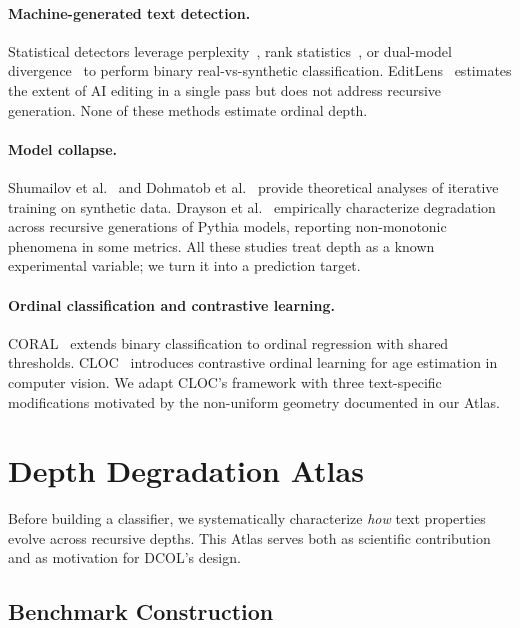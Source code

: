 \documentclass[11pt,a4paper]{article}
\newcommand{\ours}{DCOL}
\newcommand{\atlas}{Atlas}
\begin{document}
\paragraph{Machine-generated text detection.}
Statistical detectors leverage perplexity~\cite{solaiman2019release}, rank statistics~\cite{mitchell2023detectgpt}, or dual-model divergence~\cite{hans2024binoculars,diveye2024} to perform binary real-vs-synthetic classification.
EditLens~\cite{editlens2024} estimates the extent of AI editing in a single pass but does not address recursive generation.
None of these methods estimate ordinal depth.

\paragraph{Model collapse.}
Shumailov et al.~\cite{shumailov2024ai} and Dohmatob et al.~\cite{dohmatob2024model} provide theoretical analyses of iterative training on synthetic data.
Drayson et al.~\cite{drayson2025investigating} empirically characterize degradation across recursive generations of Pythia models, reporting non-monotonic phenomena in some metrics.
All these studies treat depth as a known experimental variable; we turn it into a prediction target.

\paragraph{Ordinal classification and contrastive learning.}
CORAL~\cite{cao2020rank} extends binary classification to ordinal regression with shared thresholds.
CLOC~\cite{lu2025cloc} introduces contrastive ordinal learning for age estimation in computer vision.
We adapt CLOC's framework with three text-specific modifications motivated by the non-uniform geometry documented in our \atlas{}.

\section{Depth Degradation \atlas{}}
\label{sec:atlas}

Before building a classifier, we systematically characterize \emph{how} text properties evolve across recursive depths.
This \atlas{} serves both as scientific contribution and as motivation for \ours{}'s design.

\subsection{Benchmark Construction}
\label{sec:benchmark}
\end{document}
